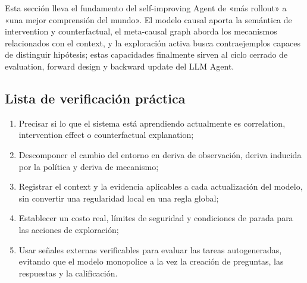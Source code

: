 Esta sección lleva el fundamento del self-improving Agent de «más rollout» a «una mejor comprensión del mundo». El modelo causal aporta la semántica de intervention y counterfactual, el meta-causal graph aborda los mecanismos relacionados con el context, y la exploración activa busca contraejemplos capaces de distinguir hipótesis; estas capacidades finalmente sirven al ciclo cerrado de evaluation, forward design y backward update del LLM Agent.

\subsection{Lista de verificación práctica}

\begin{enumerate}
    \item Precisar si lo que el sistema está aprendiendo actualmente es correlation, intervention effect o counterfactual explanation;
    \item Descomponer el cambio del entorno en deriva de observación, deriva inducida por la política y deriva de mecanismo;
    \item Registrar el context y la evidencia aplicables a cada actualización del modelo, sin convertir una regularidad local en una regla global;
    \item Establecer un costo real, límites de seguridad y condiciones de parada para las acciones de exploración;
    \item Usar señales externas verificables para evaluar las tareas autogeneradas, evitando que el modelo monopolice a la vez la creación de preguntas, las respuestas y la calificación.
\end{enumerate}
